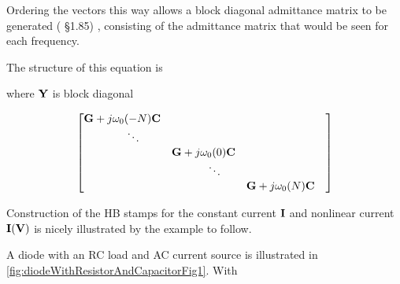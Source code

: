 Ordering the vectors this way allows a block diagonal admittance matrix to be generated (\citep{giannini2004NonlinearMicrowaveCircuitDesign}
 \S 1.85)
, consisting of the admittance matrix that would be seen for each frequency.

The structure of this equation is


where \( \mathbf{Y} \) is block diagonal

\begin{equation}\label{eqn:ece1254projectReport:1360}
\small{
\begin{bmatrix}
\BG + j \omega_0 (-N) \BC &        &                                   & \\
                            \qquad\ddots &                                   & \\
                                   &  \BG + j \omega_0 (0) \BC         & \\
                                   &                            \qquad\ddots & \\
                                   &                                   & \BG + j \omega_0 (N) \BC
\end{bmatrix}
}
\end{equation}

Construction of the HB stamps for the constant current \( \mathbf{I} \) and nonlinear current \( \mathbf{I}(\mathbf{V}) \) is nicely illustrated by the example to follow.



A diode with an RC load and AC current source is illustrated in
\cref{fig:diodeWithResistorAndCapacitorFig1}.
With

